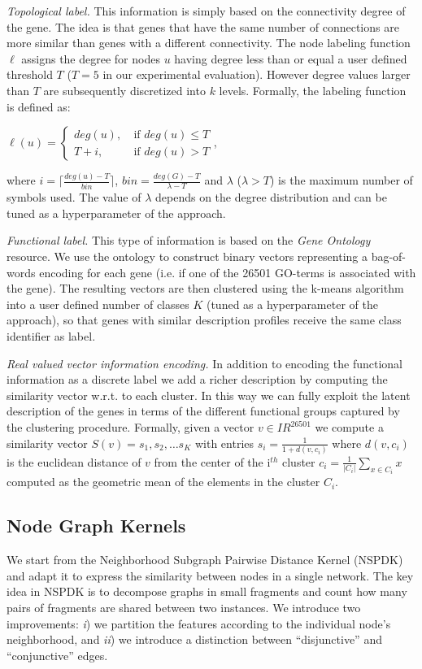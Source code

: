 \textit{Topological label.} This information is simply based on the connectivity degree of the gene. The idea is that genes that have the same number of connections are more similar than genes with a different connectivity. The node labeling function $\ell$ assigns the degree for nodes $u$ having degree less than or equal a user defined threshold $T$ ($T=5$ in our experimental evaluation). However degree values larger than $T$ are subsequently discretized into $k$ levels. Formally, the labeling function is defined as:
\begin{center}
$\ell(u) = \left\{
	\begin{array}{ll}
		deg(u),\  & \mbox{if } deg(u) \leq T \\
		T+i,\ & \mbox{if } deg(u) > T
	\end{array}
\right.$,
\end{center}
where $i = \lceil \frac{deg(u)-T}{bin}\rceil$, $bin = \frac{deg(G)-T}{\lambda - T}$ and $\lambda$ ($\lambda > T$) is the maximum number of symbols used. The value of $\lambda$ depends on the degree distribution and can be tuned as a hyperparameter of the approach.


\textit{Functional label.} This type of information is based on the \textit{Gene Ontology} \cite{gene2004gene} resource. We use the ontology to construct binary vectors representing a bag-of-words encoding for each gene (i.e. if one of the 26501 GO-terms is associated with the gene). The resulting vectors are then clustered using the k-means algorithm  into a user defined number of classes $K$ (tuned as a hyperparameter of the approach), so that genes with similar description profiles receive the same class identifier as label. 

\textit{Real valued vector information encoding.}
In addition to encoding the functional information as a discrete label we add a richer description by computing the similarity vector w.r.t. to each cluster. In this way we can fully exploit the latent description of the genes in terms of the different functional groups captured by the clustering procedure. Formally, given a vector $v \in I\!R^{26501}$ we compute a similarity vector $S(v)= {s_1, s_2, \ldots s_K}$ with entries $s_i = \frac{1}{1+d(v,c_i)}$ where $d(v,c_i)$ is the euclidean distance of $v$ from the center of the i$^{th}$ cluster $c_i = \frac{1}{|C_i|}\sum_{x \in C_i} x$ computed as the geometric mean of the elements in the cluster $C_i$.

\subsection{Node Graph Kernels} 
We start from the Neighborhood Subgraph Pairwise Distance Kernel (NSPDK) \cite{costa2010fast} and adapt it to express the similarity between nodes in a single network. The key idea in NSPDK is to decompose graphs in small fragments and count how many pairs of fragments are shared between two instances. We introduce two improvements: \textit{i}) we partition the features according to the individual node's neighborhood, and \textit{ii}) we introduce a  distinction between ``disjunctive'' and ``conjunctive'' edges.

